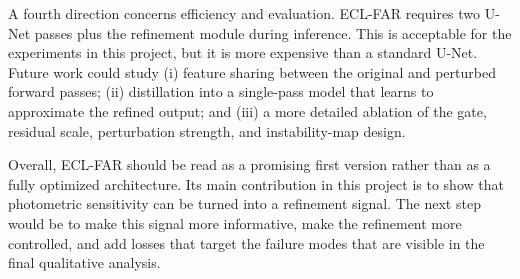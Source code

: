 A fourth direction concerns efficiency and evaluation. ECL-FAR requires two U-Net passes plus the refinement module during inference. This is acceptable for the experiments in this project, but it is more expensive than a standard U-Net. Future work could study (i) feature sharing between the original and perturbed forward passes; (ii) distillation into a single-pass model that learns to approximate the refined output; and (iii) a more detailed ablation of the gate, residual scale, perturbation strength, and instability-map design.

Overall, ECL-FAR should be read as a promising first version rather than as a fully optimized architecture. Its main contribution in this project is to show that photometric sensitivity can be turned into a refinement signal. The next step would be to make this signal more informative, make the refinement more controlled, and add losses that target the failure modes that are visible in the final qualitative analysis.